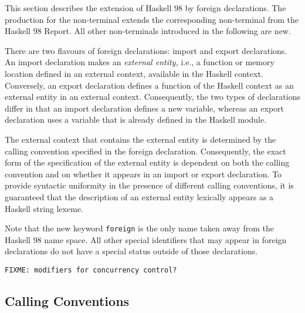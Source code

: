 \documentclass[a4paper,twosides]{article}
\newcommand{\code}[1]{\texttt{#1}}      %
\begin{document}
This section describes the extension of Haskell 98 by foreign declarations.
The production for the non-terminal  extends the corresponding
non-terminal from the Haskell 98 Report.  All other non-terminals introduced
in the following are new.
%
\begin{grammar}
\end{grammar}
%
There are two flavours of foreign declarations: import and export
declarations.  An import declaration makes an \emph{external entity,} i.e., a
function or memory location defined in an external context, available in the
Haskell context.  Conversely, an export declaration defines a function of the
Haskell context as an external entity in an external context.  Consequently,
the two types of declarations differ in that an import declaration defines a
new variable, whereas an export declaration uses a variable that is already
defined in the Haskell module.

The external context that contains the external entity is determined by the
calling convention specified in the foreign declaration.  Consequently, the
exact form of the specification of the external entity is dependent on both
the calling convention and on whether it appears in an import or export
declaration.  To provide syntactic uniformity in the presence of different
calling conventions, it is guaranteed that the description of an external
entity lexically appears as a Haskell string lexeme.

Note that the new keyword \code{foreign} is the only name taken away from the
Haskell 98 name space.  All other special identifiers that may appear in
foreign declarations do not have a special status outside of those
declarations.

\begin{verbatim}
FIXME: modifiers for concurrency control?
\end{verbatim}

\subsection{Calling Conventions}
\label{sec:call-conv}
\end{document}
